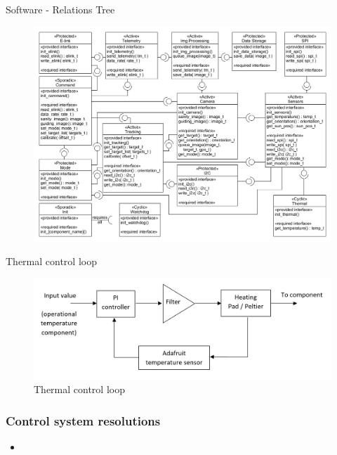 \documentclass[11pt, aspectratio=169]{beamer}
\begin{document}
\begin{frame}[c]{Software - Relations Tree}
    \begin{figure}
        \includegraphics[height=.9\textheight]{software/complete_relations_tree.png}
    \end{figure}
\end{frame}

\begin{frame}[c]{Thermal control loop}
    \begin{figure}
        \includegraphics[width=\textwidth]{figures/images/thermalcontrol.PNG}
        \caption*{Thermal control loop}
    \end{figure}
\end{frame}

\begin{frame}
    \frametitle{Control system resolutions}
    \begin{itemize}
        \item 
    \end{itemize}
\end{frame}
\end{document}
